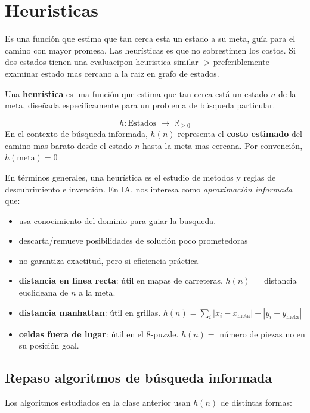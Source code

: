 \section{Heuristicas}
Es una función que estima que tan cerca esta un estado a su meta, guía para el camino con mayor promesa. Las heurísticas es que no sobrestimen los costos. Si dos estados tienen una evaluacipon heuristica similar -> preferiblemente examinar estado mas cercano a la raiz en grafo de estados.

\begin{definition}
Una \textbf{heurística} es una función que estima que tan cerca está un estado $n$ de la meta, diseñada especificamente para un problema de búsqueda particular.

\[
  h : \text{Estados} \;\longrightarrow\; \mathbb{R}_{\geq 0}
\]
En el contexto de búsqueda informada, $h(n)$ representa el \textbf{costo estimado} del camino mas barato desde el estado $n$ hasta la meta mas cercana. Por convención, $h(\text{meta}) = 0$
\end{definition}

En términos generales, una heurística es el estudio de metodos y reglas de descubrimiento e invención. En IA, nos interesa como \emph{aproximación informada} que:

\begin{itemize}
	\item usa conocimiento del dominio para guiar la busqueda.
	\item descarta/remueve posibilidades de solución poco prometedoras
	\item no garantiza exactitud, pero si eficiencia práctica
\end{itemize}

\begin{itemize}
		\item \textbf{distancia en linea recta}: útil en mapas de carreteras. $h(n) = $ distancia euclideana de $n$ a la meta.
		\item \textbf{distancia manhattan}: útil en grillas. $h(n) = \sum_i |x_i - x_{\text{meta}} | + |y_i -  y_{\text{meta}}|$
		\item \textbf{celdas fuera de lugar}: útil en el 8-puzzle. $h(n) = $ número de piezas no en su posición goal.
\end{itemize}

\subsection{Repaso algoritmos de búsqueda informada}
Los algoritmos estudiados en la clase anterior usan $h(n)$ de distintas formas:

